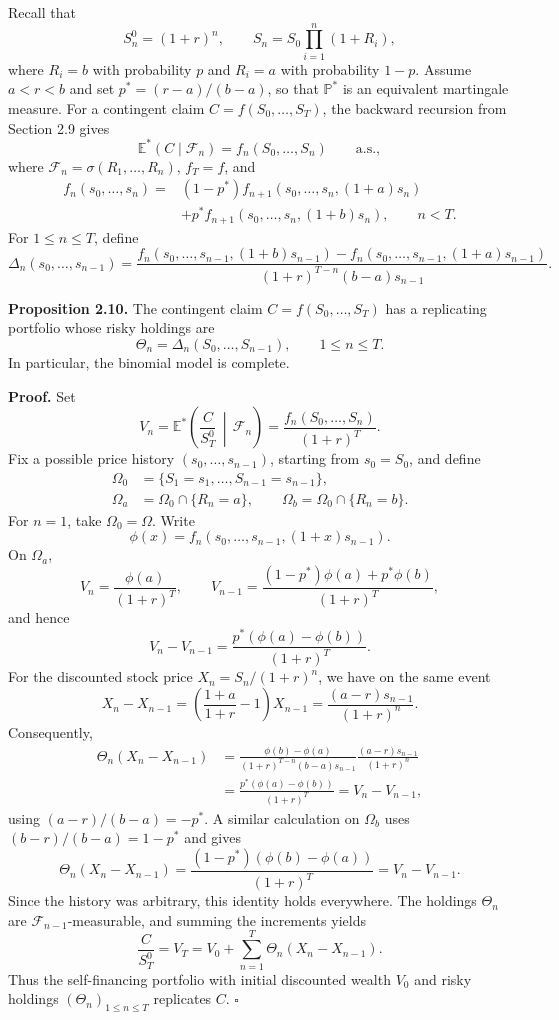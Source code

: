 \documentclass[11pt,a4paper]{article}
\begin{document}
Recall that
\[
S_n^0=(1+r)^n,\qquad S_n=S_0\prod_{i=1}^n(1+R_i),
\]
where $R_i=b$ with probability $p$ and $R_i=a$ with probability
$1-p$. Assume $a<r<b$ and set $p^*=(r-a)/(b-a)$, so that
$\mathbb P^*$ is an equivalent martingale measure.
For a contingent claim $C=f(S_0,\ldots,S_T)$, the backward recursion
from Section 2.9 gives
\[
\mathbb E^*(C\mid\mathcal F_n)=f_n(S_0,\ldots,S_n)
\qquad\text{a.s.},
\]
where $\mathcal F_n=\sigma(R_1,\ldots,R_n)$, $f_T=f$, and
\[
\begin{aligned}
f_n(s_0,\ldots,s_n)
={}&(1-p^*)f_{n+1}(s_0,\ldots,s_n,(1+a)s_n)\\
&+p^*f_{n+1}(s_0,\ldots,s_n,(1+b)s_n),\qquad n<T.
\end{aligned}
\]
For $1\leq n\leq T$, define
\[
\Delta_n(s_0,\ldots,s_{n-1})
=\frac{
 f_n(s_0,\ldots,s_{n-1},(1+b)s_{n-1})
 -f_n(s_0,\ldots,s_{n-1},(1+a)s_{n-1})
}{(1+r)^{T-n}(b-a)s_{n-1}}.
\]

\medskip
\noindent\textbf{Proposition 2.10.}
The contingent claim $C=f(S_0,\ldots,S_T)$ has a replicating
portfolio whose risky holdings are
\[
\Theta_n=\Delta_n(S_0,\ldots,S_{n-1}),\qquad 1\leq n\leq T.
\]
In particular, the binomial model is complete.

\noindent\textbf{Proof.}
Set
\[
V_n=\mathbb E^*\!\left(\frac{C}{S_T^0}\,\middle|\,\mathcal F_n\right)
=\frac{f_n(S_0,\ldots,S_n)}{(1+r)^T}.
\]
Fix a possible price history $(s_0,\ldots,s_{n-1})$, starting from
$s_0=S_0$, and define
\[
\begin{aligned}
\Omega_0&=\{S_1=s_1,\ldots,S_{n-1}=s_{n-1}\},\\
\Omega_a&=\Omega_0\cap\{R_n=a\},\qquad
\Omega_b=\Omega_0\cap\{R_n=b\}.
\end{aligned}
\]
For $n=1$, take $\Omega_0=\Omega$. Write
\[
\phi(x)=f_n(s_0,\ldots,s_{n-1},(1+x)s_{n-1}).
\]
On $\Omega_a$,
\[
V_n=\frac{\phi(a)}{(1+r)^T},\qquad
V_{n-1}=\frac{(1-p^*)\phi(a)+p^*\phi(b)}{(1+r)^T},
\]
and hence
\[
V_n-V_{n-1}=\frac{p^*(\phi(a)-\phi(b))}{(1+r)^T}.
\]
For the discounted stock price $X_n=S_n/(1+r)^n$, we have on
the same event
\[
X_n-X_{n-1}
=\left(\frac{1+a}{1+r}-1\right)X_{n-1}
=\frac{(a-r)s_{n-1}}{(1+r)^n}.
\]
Consequently,
\[
\begin{aligned}
\Theta_n(X_n-X_{n-1})
&=\frac{\phi(b)-\phi(a)}{(1+r)^{T-n}(b-a)s_{n-1}}
  \frac{(a-r)s_{n-1}}{(1+r)^n}\\
&=\frac{p^*(\phi(a)-\phi(b))}{(1+r)^T}
=V_n-V_{n-1},
\end{aligned}
\]
using $(a-r)/(b-a)=-p^*$.
A similar calculation on $\Omega_b$ uses
$(b-r)/(b-a)=1-p^*$ and gives
\[
\Theta_n(X_n-X_{n-1})
=\frac{(1-p^*)(\phi(b)-\phi(a))}{(1+r)^T}
=V_n-V_{n-1}.
\]
Since the history was arbitrary, this identity holds everywhere.
The holdings $\Theta_n$ are $\mathcal F_{n-1}$-measurable, and
summing the increments yields
\[
\frac{C}{S_T^0}=V_T
=V_0+\sum_{n=1}^T\Theta_n(X_n-X_{n-1}).
\]
Thus the self-financing portfolio with initial discounted wealth
$V_0$ and risky holdings $(\Theta_n)_{1\leq n\leq T}$ replicates $C$.
\hfill$\square$
\end{document}
